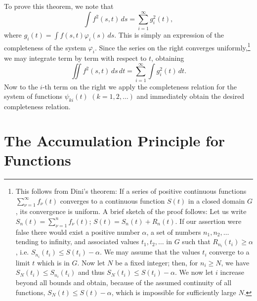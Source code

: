 To prove this theorem, we note that
\[
\int f^2(s,t)\,ds=\sum_{i=1}^{\infty}g_i^2(t),
\]
where $g_i(t)=\int f(s,t)\varphi_i(s)\,ds$. This is simply an expression of the completeness of the system $\varphi_i$. Since the series on the right converges uniformly,\footnote{This follows from Dini's theorem: If a series of positive continuous functions $\sum_{\nu=1}^{\infty}f_\nu(t)$ converges to a continuous function $S(t)$ in a closed domain $G$, its convergence is uniform. A brief sketch of the proof follows: Let us write $S_n(t)=\sum_{\nu=1}^n f_\nu(t)$; $S(t)=S_n(t)+R_n(t)$. If our assertion were false there would exist a positive number $\alpha$, a set of numbers $n_1,n_2,\ldots$ tending to infinity, and associated values $t_1,t_2,\ldots$ in $G$ such that $R_{n_i}(t_i)\ge\alpha$, i.e. $S_{n_i}(t_i)\le S(t_i)-\alpha$. We may assume that the values $t_i$ converge to a limit $t$ which is in $G$. Now let $N$ be a fixed integer; then, for $n_i\ge N$, we have $S_N(t_i)\le S_{n_i}(t_i)$ and thus $S_N(t_i)\le S(t_i)-\alpha$. We now let $i$ increase beyond all bounds and obtain, because of the assumed continuity of all functions, $S_N(t)\le S(t)-\alpha$, which is impossible for sufficiently large $N$.} we may integrate term by term with respect to $t$, obtaining
\[
\iint f^2(s,t)\,ds\,dt=\sum_{i=1}^{\infty}\int g_i^2(t)\,dt.
\]
Now to the $i$-th term on the right we apply the completeness relation for the system of functions $\psi_{ki}(t)$ $(k=1,2,\ldots)$ and immediately obtain the desired completeness relation.

\section{The Accumulation Principle for Functions}
